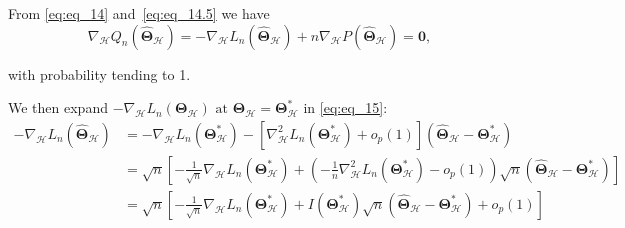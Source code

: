 \documentclass[12pt,letter]{article}\usepackage[]{graphicx}\usepackage[]{color}
\newcommand{\btheta}{\boldsymbol{\theta}}
\begin{document}
\begin{comment}
Let $Q_{n}(\btheta_{\mathcal{A}})$ denote the objective function
$Q_{n}$ only on the $\mathcal{A}-$component of $\btheta$, that
is, $Q_{n}(\btheta)$ with $\btheta_{\mathcal{A}^{c}}.$Based on Lemma
1 and Theorem 1, we have $P\left(\hat{\boldsymbol{\theta}}_{\mathcal{A}^{c}}=0\right)\rightarrow1$.
Thus, 
\[
P\left[\arg\min_{\boldsymbol{\theta}_{\mathcal{A}}}Q_{n}\left(\boldsymbol{\theta}_{\mathcal{A}}\right)=\left(\mathcal{A}\text{ -component of }\arg\min_{\boldsymbol{\theta}}Q_{n}(\boldsymbol{\theta})\right)\right]\rightarrow1.
\]

It means that $\widehat{\btheta}_{\mathcal{A}}$ should satisfy 
with probability tending to 1. 
Let $L_{n}\left(\boldsymbol{\theta}_{\mathcal{A}}\right)$ and $P_{\boldsymbol{\lambda}}\left(\boldsymbol{\theta}_{\mathcal{A}}\right)$
denote the log-likelihood function of $\btheta_{\mathcal{A}}$and
the penalty function of $\btheta_{\mathcal{A}}$ respectively so that
we have 
\[
Q_{n}\left(\boldsymbol{\theta}_{\mathcal{A}}\right)=-L_{n}\left(\boldsymbol{\theta}_{\mathcal{A}}\right)+nP_{\boldsymbol{\lambda}}\left(\boldsymbol{\theta}_{\mathcal{A}}\right).
\]
\end{comment}

From \eqref{eq:eq_14} and~\eqref{eq:eq_14.5} we have
\begin{equation}
\nabla_{\mathcal{H}}Q_{n}\left(\widehat{\boldsymbol{\Theta}}_{\mathcal{H}}\right)=-\nabla_{\mathcal{H}}L_{n}\left(\widehat{\boldsymbol{\Theta}}_{\mathcal{H}}\right)+n\nabla_{\mathcal{H}}P\left(\widehat{\boldsymbol{\Theta}}_{\mathcal{H}}\right)=\mathbf{0},\label{eq:eq_15}
\end{equation}

with probability tending to 1. 

We then expand $-\nabla_{\mathcal{H}}L_{n}\left(\boldsymbol{\Theta}_{\mathcal{H}}\right)\text{ at }\boldsymbol{\Theta}_{\mathcal{H}}=\boldsymbol{\Theta}_{\mathcal{H}}^{*}$ in \eqref{eq:eq_15}:
	\[
	\begin{aligned}-\nabla_{\mathcal{H}}L_{n}\left(\widehat{\boldsymbol{\Theta}}_{\mathcal{H}}\right) & =-\nabla_{\mathcal{H}}L_{n}\left(\boldsymbol{\Theta}_{\mathcal{H}}^{*}\right)-\left[\nabla_{\mathcal{H}}^{2}L_{n}\left(\boldsymbol{\Theta}_{\mathcal{H}}^{*}\right)+o_{p}(1)\right]\left(\widehat{\boldsymbol{\Theta}}_{\mathcal{H}}-\boldsymbol{\Theta}_{\mathcal{H}}^{*}\right)\\
	& =\sqrt{n}\left[-\frac{1}{\sqrt{n}}\nabla_{\mathcal{H}}L_{n}\left(\boldsymbol{\Theta}_{\mathcal{H}}^{*}\right)+\left(-\frac{1}{n}\nabla_{\mathcal{H}}^{2}L_{n}\left(\boldsymbol{\Theta}_{\mathcal{H}}^{*}\right)-o_{p}(1)\right)\sqrt{n}\left(\widehat{\boldsymbol{\Theta}}_{\mathcal{H}}-\boldsymbol{\Theta}_{\mathcal{H}}^{*}\right)\right]\\
	& =\sqrt{n}\left[-\frac{1}{\sqrt{n}}\nabla_{\mathcal{H}}L_{n}\left(\boldsymbol{\Theta}_{\mathcal{H}}^{*}\right)+I\left(\boldsymbol{\Theta}_{\mathcal{H}}^{*}\right)\sqrt{n}\left(\widehat{\boldsymbol{\Theta}}_{\mathcal{H}}-\boldsymbol{\Theta}_{\mathcal{H}}^{*}\right)+o_{p}(1)\right]
	\end{aligned}
	\]
\end{document}

